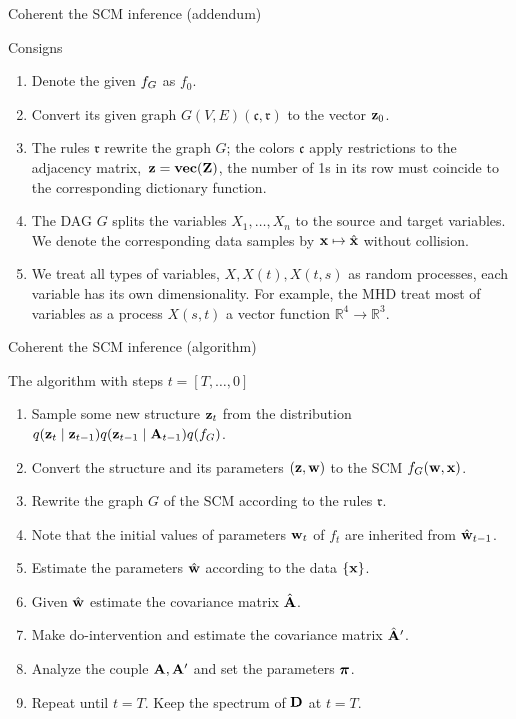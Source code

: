 \documentclass{beamer}
\newcommand{\fr}{{\mathfrak{r}}}
\newcommand{\fc}{{\mathfrak{c}}}
\begin{document}
\begin{frame}{Coherent the SCM inference (addendum)}

\begin{block}{Consigns}
\begin{enumerate}
\item Denote the given ${f_{G}}$ as $f_0$. 
\item Convert its given graph $G(V,E)(\fc,\fr)$ to the vector $\mathbf{z}_0$.
\item {The rules $\fr$ rewrite the graph $G$; the colors $\fc$ apply restrictions to the adjacency matrix,~$\mathbf{z}=\textbf{vec}({\mathbf{Z}})$, the number of 1s in its row must coincide to the corresponding dictionary function.}
\item The DAG $G$ splits the variables $X_1,\dots,X_n$ to the source and target variables. We denote the corresponding data samples by $\mathbf{x}\mapsto \hat{\mathbf{x}}$ without collision. 
\item We treat all types of variables, $X, X(t), X(t,s)$ as random processes, each variable has its own dimensionality. For example, the MHD treat most of variables as a process $X(s,t)$ a vector function $\mathbb{R}^4\to\mathbb{R}^3$.
\end{enumerate}
\end{block}
\end{frame}
\begin{frame}{Coherent the SCM inference (algorithm)}

\begin{block}{The algorithm with steps $t = [T,\dots,0]$}
\begin{enumerate}
\item Sample some new structure $\mathbf{z}_t$ from the distribution  $q(\mathbf{z}_t\mid\mathbf{z}_{t-1})q(\mathbf{z}_{t-1}\mid\mathbf{A}_{t-1})q({f_{G}})$.
\item Convert the structure and its parameters $(\mathbf{z},\mathbf{w})$ to  the SCM ${f_{G}}(\mathbf{w},\mathbf{x})$.
\item Rewrite the graph $G$ of the SCM according to the rules $\fr$.
\item Note that the initial values of parameters $\mathbf{w}_t$ of $f_t$ are inherited from $\hat{\mathbf{w}}_{t-1}$. 
\item Estimate the parameters $\hat{\mathbf{w}}$ according to the data $\{\mathbf{x}\}$.
\item Given $\hat{\mathbf{w}}$ estimate the covariance matrix $\hat{\mathbf{A}}$.
\item Make do-intervention and estimate the covariance matrix $\hat{\mathbf{A}}^\prime$.
\item Analyze the couple $\mathbf{A},\mathbf{A}^\prime$ and set the parameters ${\boldsymbol{\pi}}$.
\item Repeat until $t=T$. Keep the spectrum of $\mathbf{D}$ at $t=T$.
\end{enumerate}
\end{block}
\end{frame}
\end{document}
